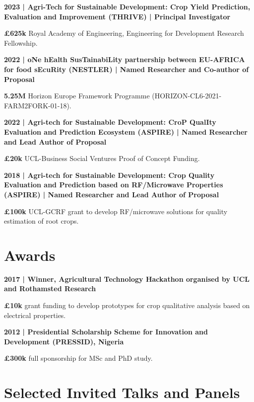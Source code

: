 \documentclass[a4paper,11pt]{article}
\newcommand{\funding}[2]{%
    \vspace{2pt}
    \noindent\textbf{#1}\par
    \vspace{1pt}
    #2\par
    \vspace{5pt}
}
\begin{document}
\funding
{2023 | Agri-Tech for Sustainable Development: Crop Yield Prediction, Evaluation and Improvement (THRIVE) | \textbf{Principal Investigator}}
{\textbf{\pounds625k} Royal Academy of Engineering, Engineering for Development Research Fellowship.}

\funding
{2022 | oNe hEalth SusTainabiLity partnership between EU-AFRICA for food sEcuRity (NESTLER) | \textbf{Named Researcher and Co-author of Proposal}}
{\textbf{\texteuro5.25M} Horizon Europe Framework Programme (HORIZON-CL6-2021-FARM2FORK-01-18).}

\funding
{2022 | Agri-tech for Sustainable Development: CroP QualIty Evaluation and Prediction Ecosystem (ASPIRE) | \textbf{Named Researcher and Lead Author of Proposal}}
{\textbf{\pounds20k} UCL-Business Social Ventures Proof of Concept Funding.}

\funding
{2018 | Agri-tech for Sustainable Development: Crop Quality Evaluation and Prediction based on RF/Microwave Properties (ASPIRE) | \textbf{Named Researcher and Lead Author of Proposal}}
{\textbf{\pounds100k} UCL-GCRF grant to develop RF/microwave solutions for quality estimation of root crops.}


\section{Awards}

\funding
{2017 | Winner, Agricultural Technology Hackathon organised by UCL and Rothamsted Research}
{\textbf{\pounds10k} grant funding to develop prototypes for crop qualitative analysis based on electrical properties.}

\funding
{2012 | Presidential Scholarship Scheme for Innovation and Development (PRESSID), Nigeria}
{\textbf{\pounds300k} full sponsorship for MSc and PhD study.}


\section{Selected Invited Talks and Panels}
\end{document}
